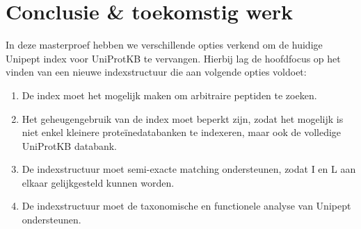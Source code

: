 \chapter{Conclusie \& toekomstig werk}\label{ch:conclusie}
In deze masterproef hebben we verschillende opties verkend om de huidige Unipept index voor UniProtKB te vervangen.
Hierbij lag de hoofdfocus op het vinden van een nieuwe indexstructuur die aan volgende opties voldoet:
\begin{enumerate}
    \item De index moet het mogelijk maken om arbitraire peptiden te zoeken.
    \item Het geheugengebruik van de index moet beperkt zijn, zodat het mogelijk is niet enkel kleinere proteïnedatabanken te indexeren, maar ook de volledige UniProtKB databank.
    \item De indexstructuur moet semi-exacte matching ondersteunen, zodat I en L aan elkaar gelijkgesteld kunnen worden.
    \item De indexstructuur moet de taxonomische en functionele analyse van Unipept ondersteunen.
\end{enumerate}

